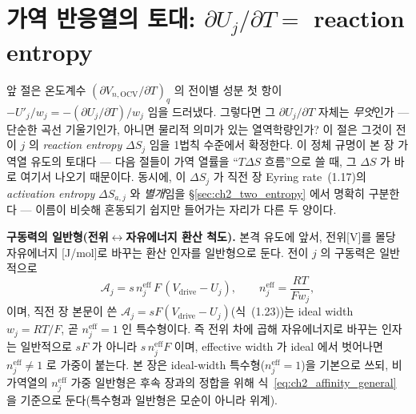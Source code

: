 \documentclass[11pt,a4paper]{article}
\newcommand{\eff}{\mathrm{eff}}
\newcommand{\drive}{\mathrm{drive}}
\newcommand{\OCV}{\mathrm{OCV}}
\begin{document}
\section{가역 반응열의 토대: $\partial U_j/\partial T=$ reaction entropy}\label{sec:ch2_entropy}
앞 절은 온도계수 $(\partial V_{n,\OCV}/\partial T)_q$ 의 전이별 성분 첫 항이 $-U'_j/w_j=-(\partial U_j/\partial T)/w_j$
임을 드러냈다. 그렇다면 그 $\partial U_j/\partial T$ 자체는 \emph{무엇}인가 — 단순한 곡선 기울기인가, 아니면 물리적
의미가 있는 열역학량인가? 이 절은 그것이 전이 $j$ 의 \emph{reaction entropy} $\Delta S_j$ 임을 1법칙 수준에서
확정한다. 이 정체 규명이 본 장 가역열 유도의 토대다 — 다음 절들이 가역 열률을 ``$T\Delta S$ 흐름''으로 쓸 때, 그
$\Delta S$ 가 바로 여기서 나오기 때문이다. 동시에, 이 $\Delta S_j$ 가 직전 장 Eyring rate~(1.17)의
\emph{activation entropy} $\Delta S_{a,j}$ 와 \emph{별개}임을 \S\ref{sec:ch2_two_entropy} 에서 명확히 구분한다 — 이름이
비슷해 혼동되기 쉽지만 들어가는 자리가 다른 두 양이다.

\textbf{구동력의 일반형(전위$\leftrightarrow$자유에너지 환산 척도).} 본격 유도에 앞서, 전위[V]를 몰당 자유에너지
[J/mol]로 바꾸는 환산 인자를 일반형으로 둔다. 전이 $j$ 의 구동력은 일반적으로
\begin{equation}
\mathcal A_j=s\,n_j^{\eff}\,F\,(V_\drive-U_j),\qquad n_j^{\eff}=\frac{RT}{Fw_j},
\label{eq:ch2_affinity_general}
\end{equation}
이며, 직전 장 본문이 쓴 $\mathcal A_j=sF(V_\drive-U_j)$(식~(1.23))는 ideal width $w_j=RT/F$, 곧 $n_j^{\eff}=1$ 인
특수형이다. 즉 전위 차에 곱해 자유에너지로 바꾸는 인자는 일반적으로 $sF$ 가 아니라 $s\,n_j^{\eff}F$ 이며,
effective width 가 ideal 에서 벗어나면 $n_j^{\eff}\ne1$ 로 가중이 붙는다. 본 장은 ideal-width 특수형($n_j^{\eff}=1$)을
기본으로 쓰되, 비가역열의 $n_j^{\eff}$ 가중 일반형은 후속 장과의 정합을 위해 식~\eqref{eq:ch2_affinity_general} 을
기준으로 둔다(특수형과 일반형은 모순이 아니라 위계).
\end{document}
